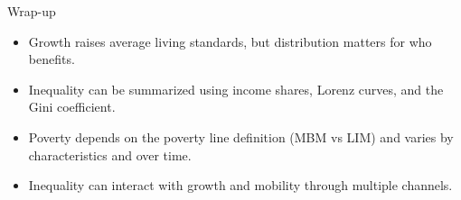 \documentclass[aspectratio=169]{beamer}
\begin{document}
\begin{frame}{Wrap-up}
\transfade
\begin{itemize}[<+->]
\item Growth raises average living standards, but distribution matters for who benefits.
\item Inequality can be summarized using income shares, Lorenz curves, and the Gini coefficient.
\item Poverty depends on the poverty line definition (MBM vs LIM) and varies by characteristics and over time.
\item Inequality can interact with growth and mobility through multiple channels.
\end{itemize}
\end{frame}
\end{document}
